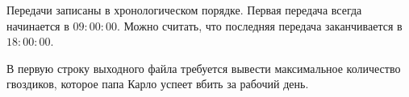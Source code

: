 \begin{problem}
Передачи записаны в хронологическом порядке. Первая передача всегда начинается в $09:00:00$. Можно считать, что последняя передача заканчивается в $18:00:00$.

\OutputFile

В первую строку выходного файла требуется вывести максимальное количество гвоздиков, которое папа Карло успеет вбить за рабочий день.

\Examples

\begin{example}

%
%
\end{example}
\end{problem}